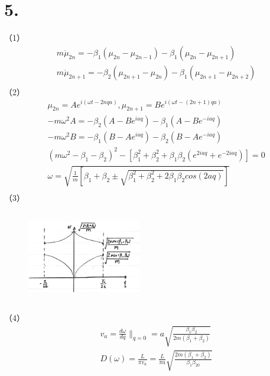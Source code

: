 \documentclass[UTF8]{ctexart}
\begin{document}
\section*{5.}
（1）
\begin{equation*}
    \begin{aligned}
        & m\ddot\mu_{2n}=-\beta_1(\mu_{2n}-\mu_{2n-1})-\beta_1(\mu_{2n}-\mu_{2n+1})\\
        & m\ddot\mu_{2n+1}=-\beta_2(\mu_{2n+1}-\mu_{2n})-\beta_1(\mu_{2n+1}-\mu_{2n+2})\\
    \end{aligned}
\end{equation*}
（2）
\begin{equation*}
    \begin{aligned}
        & \mu_{2n} = Ae^{i(\omega t-2nqa)}, \mu_{2n+1} = Be^{i(\omega t-(2n+1)qa)}\\
        & -m\omega^2A=-\beta_2(A-Be^{iaq})-\beta_1(A-Be^{-iaq})\\
        & -m\omega^2B=-\beta_1(B-Ae^{iaq})-\beta_2(B-Ae^{-iaq})\\
        & (m\omega^2 -\beta_1 -\beta_2)^2-[\beta_1^2+\beta_2^2+\beta_1\beta_2(e^{2iaq}+e^{-2iaq})]=0\\
        & \omega = \sqrt{\frac{1}{m}[\beta_1+\beta_2\pm\sqrt{\beta_1^2+\beta_2^2+2\beta_1\beta_2cos(2aq)}]}\\
    \end{aligned}
\end{equation*}
（3）
\begin{figure}[H]                                         
    \centering                                                
    \includegraphics[width=5cm,height=4cm]{ans-5-3.jpg}       
    \caption*{}                                                                              
    \end{figure}
（4）
\begin{equation*}
    \begin{aligned}
        & v_a = \frac{d\omega}{dq}\lVert_{q=0}=a\sqrt{\frac{\beta_1\beta_2}{2m(\beta_1+\beta_2)}}\\
        & D(\omega) = \frac{L}{\pi v_a}=\frac{L}{\pi a}\sqrt{\frac{2m(\beta_1+\beta_2)}{\beta_1\beta_20}}\\
    \end{aligned}
\end{equation*}
\end{document}
